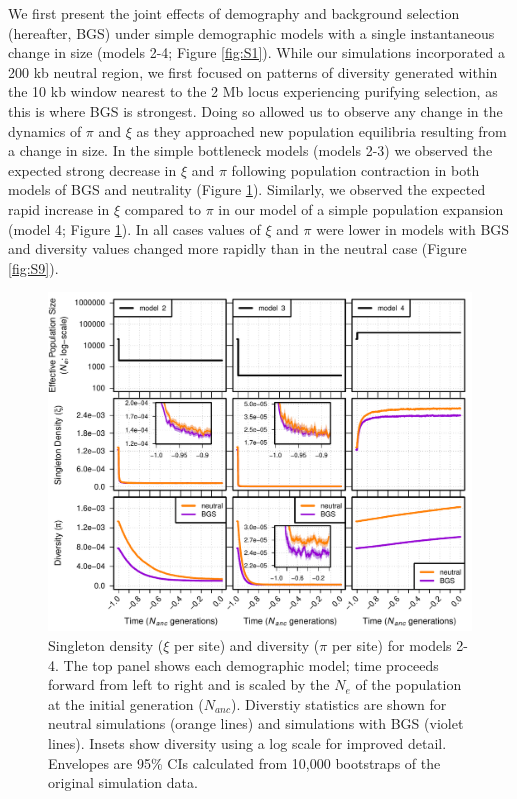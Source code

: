 \documentclass[9pt,twocolumn,twoside]{rilabRxiv}
\begin{document}
We first present the joint effects of demography and background selection (hereafter, BGS) under simple demographic models with a single instantaneous change in size (models 2-4; Figure \ref{fig:S1}).
While our simulations incorporated a 200 kb neutral region, we first focused on patterns of diversity generated within the 10 kb window nearest to the 2 Mb locus experiencing purifying selection, as this is where BGS is strongest.
Doing so allowed us to observe any change in the dynamics of $\pi$ and $\xi$ as they approached new population equilibria resulting from a change in size.
In the simple bottleneck models (models 2-3) we observed the expected strong decrease in $\xi$ and $\pi$ following  population contraction in both models of BGS and neutrality (Figure \ref{fig:S6}).
Similarly, we observed the expected rapid increase in $\xi$ compared to $\pi$ in our model of a simple population expansion (model 4; Figure \ref{fig:S6}). 
In all cases values of $\xi$ and $\pi$ were lower in models with BGS and diversity values changed more rapidly than in the neutral case (Figure \ref{fig:S9}).

\begin{figure}[]
\includegraphics[width=\linewidth]{figures/FigS6.pdf}
\caption{Singleton density ($\xi$ per site) and diversity ($\pi$ per site) for models 2-4.
The top panel shows each demographic model; time proceeds forward from left to right and is scaled by the $N_e$ of the population at the initial generation ($N_{anc}$).
Diverstiy statistics are shown for neutral simulations (orange lines) and simulations with BGS (violet lines).
Insets show diversity using a log scale for improved detail.
Envelopes are 95\% CIs calculated from 10,000 bootstraps of the original simulation data.}
\label{fig:S6}
\end{figure}
\end{document}
